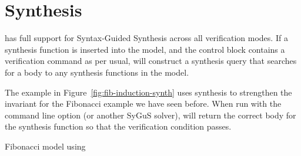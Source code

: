 \section{Synthesis}

\uclid{} has full support for Syntax-Guided Synthesis across all verification modes. If a synthesis function is inserted into the \uclid model, and the control block contains a verification command as per usual, \uclid{} will construct a synthesis query that searches for a body to any synthesis functions in the model. 

The example in Figure~\ref{fig:fib-induction-synth} uses synthesis to strengthen the invariant for the Fibonacci example we have seen before. When run with the command line option  (or another SyGuS solver), \uclid{} will return the correct body for the synthesis function so that the verification condition passes.

\begin{uclidlisting}[htbp]
    
    \caption{\uclid{} Fibonacci model using }
    \label{ex:fib-induction-synth}
\end{uclidlisting}


